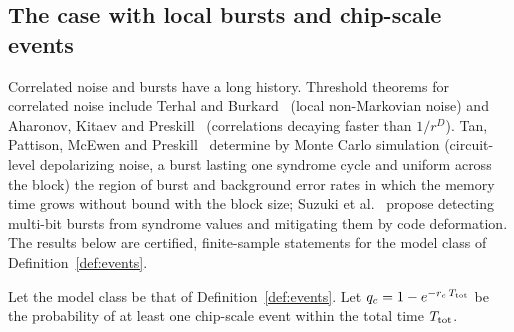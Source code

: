 \subsection{The case with local bursts and chip-scale events}

Correlated noise and bursts have a long history. Threshold theorems for correlated noise include Terhal and Burkard~\cite{TerhalBurkard} (local non-Markovian noise) and Aharonov, Kitaev and Preskill~\cite{AKP} (correlations decaying faster than $1/r^D$). Tan, Pattison, McEwen and Preskill~\cite{TPMP} determine by Monte Carlo simulation (circuit-level depolarizing noise, a burst lasting one syndrome cycle and uniform across the block) the region of burst and background error rates in which the memory time grows without bound with the block size; Suzuki et al.~\cite{Q3DE} propose detecting multi-bit bursts from syndrome values and mitigating them by code deformation.
The results below are certified, finite-sample statements for the model class of Definition~\ref{def:events}.

Let the model class be that of Definition~\ref{def:events}. Let $q_c=1-e^{-r_c\,T_{\rm tot}}$ be the probability of at least one chip-scale event within the total time $T_{\rm tot}$.

